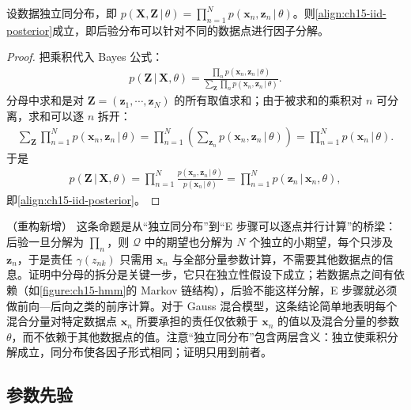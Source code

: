 \documentclass[../../main.tex]{subfiles}
\begin{document}
\begin{proposition}[后验在数据点上的因子分解]\label{proposition:ch15-后验因子分解}
设数据独立同分布，即 $p(\bm{X},\bm{Z}\,|\,\theta)=\prod_{n=1}^{N}p(\bm{x}_n,\bm{z}_n\,|\,\theta)$。则\eqref{align:ch15-iid-posterior}成立，即后验分布可以针对不同的数据点进行因子分解。
\end{proposition}
\begin{proof}
把乘积代入 Bayes 公式：
\begin{align*}
p(\bm{Z}\,|\,\bm{X},\theta)=\frac{\prod_{n}p(\bm{x}_n,\bm{z}_n\,|\,\theta)}{\sum_{\bm{Z}}\prod_{n}p(\bm{x}_n,\bm{z}_n\,|\,\theta)}.
\end{align*}
分母中求和是对 $\bm{Z}=(\bm{z}_1,\cdots,\bm{z}_N)$ 的所有取值求和；由于被求和的乘积对 $n$ 可分离，求和可以逐 $n$ 拆开：
\begin{align*}
\sum_{\bm{Z}}\prod_{n=1}^{N}p(\bm{x}_n,\bm{z}_n\,|\,\theta)=\prod_{n=1}^{N}\left(\sum_{\bm{z}_n}p(\bm{x}_n,\bm{z}_n\,|\,\theta)\right)=\prod_{n=1}^{N}p(\bm{x}_n\,|\,\theta).
\end{align*}
于是
\begin{align*}
p(\bm{Z}\,|\,\bm{X},\theta)=\prod_{n=1}^{N}\frac{p(\bm{x}_n,\bm{z}_n\,|\,\theta)}{p(\bm{x}_n\,|\,\theta)}=\prod_{n=1}^{N}p(\bm{z}_n\,|\,\bm{x}_n,\theta),
\end{align*}
即\eqref{align:ch15-iid-posterior}。
\end{proof}

\begin{remark}（重构新增）
这条命题是从“独立同分布”到“E 步骤可以逐点并行计算”的桥梁：后验一旦分解为 $\prod_n$，则 $\mathcal{Q}$ 中的期望也分解为 $N$ 个独立的小期望，每个只涉及 $\bm{z}_n$，于是责任 $\gamma(z_{nk})$ 只需用 $\bm{x}_n$ 与全部分量参数计算，不需要其他数据点的信息。证明中分母的拆分是关键一步，它只在独立性假设下成立；若数据点之间有依赖（如\cref{figure:ch15-hmm}的 Markov 链结构），后验不能这样分解，E 步骤就必须做前向—后向之类的前序计算。对于 Gauss 混合模型，这条结论简单地表明每个混合分量对特定数据点 $\bm{x}_n$ 所要承担的责任仅依赖于 $\bm{x}_n$ 的值以及混合分量的参数 $\theta$，而不依赖于其他数据点的值。注意“独立同分布”包含两层含义：独立使乘积分解成立，同分布使各因子形式相同；证明只用到前者。
\end{remark}

\subsection{参数先验}\label{subsection:ch15-参数先验}
\end{document}
